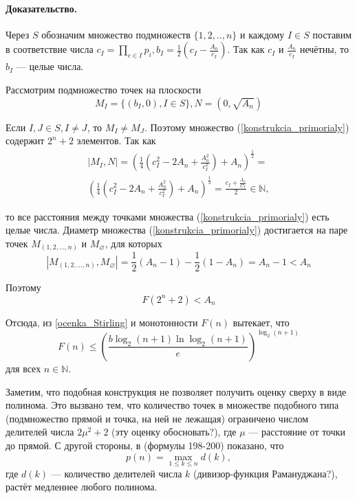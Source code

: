 \documentclass[a4paper,14pt]{article} %
\begin{document}
\paragraph{Доказательство.} Через $S$ обозначим множество подмножеств $\{1,2,..,n\}$ и каждому $I\in S$ поставим в соответствие числа $c_I=\prod\limits_{c\in I}p_i, b_I=\frac{1}{2}\left(c_I-\frac{A_n}{c_I}\right)$.
Так как $c_I$ и $\frac{A_n}{c_I}$ нечётны, то $b_I$ --- целые числа.

Рассмотрим подмножество точек на плоскости
\begin{equation}\label{konstrukcia_primorialy}
M_I=\{(b_I,0), I\in S\}, N=(0, \sqrt{A_n})
\end{equation}


Если $I,J \in S, I \neq J$, то $M_I \neq M_J$.
Поэтому множество (\ref{konstrukcia_primorialy}) содержит $2^n+2$ элементов.
Так как
\begin{multline*}
	|M_I,N|=\left(\frac{1}{4}\left( c_I^2 - 2 A_n + \frac{A_n^2}{c_I^2} \right)+A_n\right)^\frac{1}{2}=\\
	\left(\frac{1}{4}\left( c_I^2 - 2 A_n + \frac{A_n^2}{c_I^2} \right)+A_n\right)^\frac{1}{2}=
	\frac{c_I+\frac{A_n}{C_I}}{2} \in \mathbb{N},
\end{multline*}

то все расстояния между точками множества (\ref{konstrukcia_primorialy}) есть целые числа.
Диаметр множества (\ref{konstrukcia_primorialy}) достигается на паре точек $M_{(1,2,...,n)}$ и $M_{\varnothing}$, для которых
$$
|M_{(1,2,...,n)},M_{\varnothing}|=\frac{1}{2}(A_n-1)-\frac{1}{2}(1-A_n) = A_n-1 < A_n
$$

Поэтому 
$$
F(2^n+2) < A_n
$$

Отсюда, из \ref{ocenka_Stirling} и монотонности $F(n)$ вытекает, что
\begin{equation}\label{ocenka_primoryaly}
F(n) \leq \left( \frac{b \log_2(n+1) \ln \log_2 (n+1)}{e}\right)^{\log_2(n+1)}
\end{equation}
для всех $n\in \mathbb{N}$.


Заметим, что подобная конструкция не позволяет получить оценку сверху в виде полинома.
Это вызвано тем, что количество точек в множестве подобного типа (подмножество прямой и точка, на ней не лежащая) ограничено числом  делителей числа $2\mu^2+2$ (эту оценку обосновать?), где $\mu$ --- расстояние от точки до прямой.
С другой стороны, в \cite{Ramanujan} (формулы 198-200) показано, что
$$
p(n)=\max\limits_{1\leq k \leq n} d(k),
$$
где $d(k)$ --- количество делителей числа $k$ (дивизор-функция Рамануджана?),
растёт медленнее любого полинома.
\end{document}
